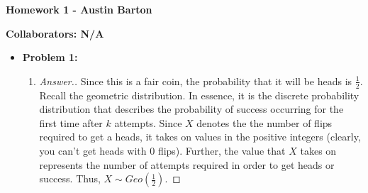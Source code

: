 \documentclass[10pt,twoside]{article}
\begin{document}
\begin{center}
\huge{\bf{Homework 1} - Austin Barton}
\end{center}

\medskip

\noindent \large{\textbf{Collaborators: N/A}}

\medskip

\begin{itemize}
    \item\textbf{Problem 1:} \newline
    \noindent\makebox[\linewidth]{\rule{18cm}{0.4pt}}
    \begin{enumerate}
        \item 
    \begin{proof}[Answer.] Since this is a fair coin, the probability that it will be heads is $\frac{1}{2}$. Recall the geometric distribution. In essence, it is the discrete probability distribution that describes the probability of success occurring for the first time after $k$ attempts. Since $X$ denotes the the number of flips required to get a heads, it takes on values in the positive integers (clearly, you can't get heads with $0$ flips). Further, the value that $X$ takes on represents the number of attempts required in order to get heads or success. Thus,
    $X\sim Geo(\frac{1}{2})$. 


\end{proof}
\end{enumerate}
\end{itemize}
\end{document}
